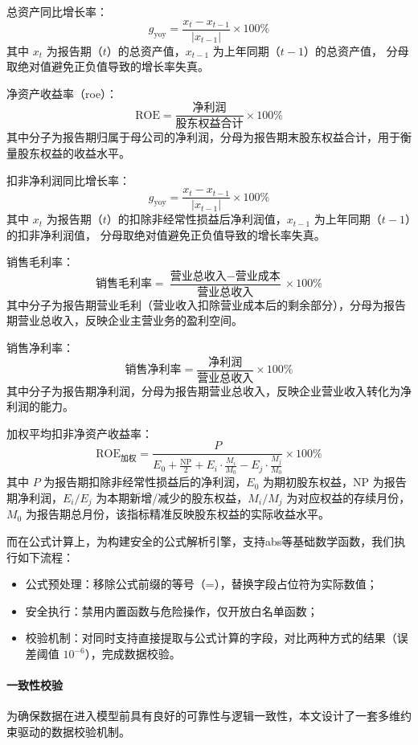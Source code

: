\documentclass[withoutpreface,bwprint]{cumcmthesis} %
\begin{document}
总资产同比增长率：
\[
	g_{\text{yoy}} = \frac{x_t - x_{t-1}}{|x_{t-1}|} \times 100\%
\]
其中 $x_t$ 为报告期（$t$）的总资产值，$x_{t-1}$ 为上年同期（$t-1$）的总资产值，
分母取绝对值避免正负值导致的增长率失真。

净资产收益率（roe）：
\[
	\text{ROE} = \frac{\text{净利润}}{\text{股东权益合计}} \times 100\%
\]
其中分子为报告期归属于母公司的净利润，分母为报告期末股东权益合计，用于衡量股东权益的收益水平。

扣非净利润同比增长率：
\[
	g_{\text{yoy}} = \frac{x_t - x_{t-1}}{|x_{t-1}|} \times 100\%
\]
其中 $x_t$ 为报告期（$t$）的扣除非经常性损益后净利润值，$x_{t-1}$ 为上年同期（$t-1$）的扣非净利润值，
分母取绝对值避免正负值导致的增长率失真。

销售毛利率：
\[
	\text{销售毛利率} = \frac{\text{营业总收入} - \text{营业成本}}{\text{营业总收入}} \times 100\%
\]
其中分子为报告期营业毛利（营业收入扣除营业成本后的剩余部分），分母为报告期营业总收入，反映企业主营业务的盈利空间。

销售净利率：
\[
	\text{销售净利率} = \frac{\text{净利润}}{\text{营业总收入}} \times 100\%
\]
其中分子为报告期净利润，分母为报告期营业总收入，反映企业营业收入转化为净利润的能力。

加权平均扣非净资产收益率：
\[
	\text{ROE}_{\text{加权}} = \frac{P}{E_0 + \frac{\text{NP}}{2} + E_i \cdot \frac{M_i}{M_0} - E_j \cdot \frac{M_j}{M_0}} \times 100\%
\]
其中 $P$ 为报告期扣除非经常性损益后的净利润，$E_0$ 为期初股东权益，$\text{NP}$ 为报告期净利润，$E_i/E_j$ 为本期新增/减少的股东权益，$M_i/M_j$ 为对应权益的存续月份，$M_0$ 为报告期总月份，该指标精准反映股东权益的实际收益水平。

而在公式计算上，为构建安全的公式解析引擎，支持abs等基础数学函数，我们执行如下流程：
\begin{itemize}[leftmargin=*]
	\item 公式预处理：移除公式前缀的等号（=），替换字段占位符为实际数值；
	\item 安全执行：禁用内置函数与危险操作，仅开放白名单函数；
	\item 校验机制：对同时支持直接提取与公式计算的字段，对比两种方式的结果（误差阈值 $10^{-6}$），完成数据校验。
\end{itemize}
\paragraph{一致性校验}

为确保数据在进入模型前具有良好的可靠性与逻辑一致性，本文设计了一套多维约束驱动的数据校验机制。
\end{document}
